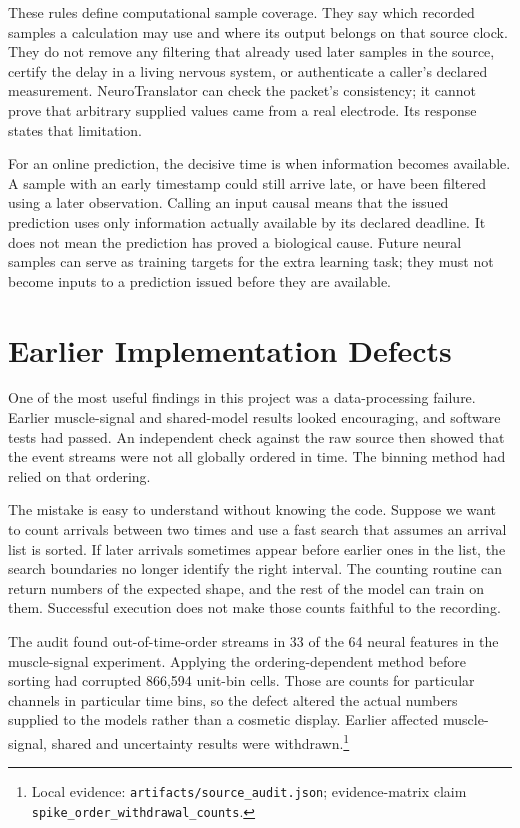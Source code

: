 These rules define computational sample coverage. They say which recorded samples a calculation may use and where its output belongs on that source clock. They do not remove any filtering that already used later samples in the source, certify the delay in a living nervous system, or authenticate a caller's declared measurement. NeuroTranslator can check the packet's consistency; it cannot prove that arbitrary supplied values came from a real electrode. Its response states that limitation.

For an online prediction, the decisive time is when information becomes
available. A sample with an early timestamp could still arrive late, or have
been filtered using a later observation. Calling an input causal means that
the issued prediction uses only information actually available by its declared
deadline. It does not mean the prediction has proved a biological cause. Future
neural samples can serve as training targets for the extra learning task;
they must not become inputs to a prediction issued before they are available.

\section{Earlier Implementation Defects}

One of the most useful findings in this project was a data-processing failure. Earlier muscle-signal and shared-model results looked encouraging, and software tests had passed. An independent check against the raw source then showed that the event streams were not all globally ordered in time. The binning method had relied on that ordering.

The mistake is easy to understand without knowing the code. Suppose we want to count arrivals between two times and use a fast search that assumes an arrival list is sorted. If later arrivals sometimes appear before earlier ones in the list, the search boundaries no longer identify the right interval. The counting routine can return numbers of the expected shape, and the rest of the model can train on them. Successful execution does not make those counts faithful to the recording.

The audit found out-of-time-order streams in 33 of the 64 neural features in the muscle-signal experiment. Applying the ordering-dependent method before sorting had corrupted 866,594 unit-bin cells. Those are counts for particular channels in particular time bins, so the defect altered the actual numbers supplied to the models rather than a cosmetic display. Earlier affected muscle-signal, shared and uncertainty results were withdrawn.\footnote{Local evidence: \texttt{artifacts/source\_audit.json}; evidence-matrix claim \texttt{spike\_\allowbreak{}order\_\allowbreak{}withdrawal\_\allowbreak{}counts}.}

